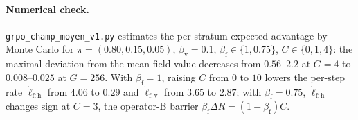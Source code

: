 \paragraph{Numerical check.} \texttt{grpo\_champ\_moyen\_v1.py} estimates the per-stratum expected advantage by Monte Carlo for $\pi = (0.80, 0.15, 0.05)$, $\beta_{\mathrm{v}} = 0.1$, $\beta_{\mathrm{f}} \in \{1, 0.75\}$, $C \in \{0, 1, 4\}$: the maximal deviation from the mean-field value decreases from $0.56$--$2.2$ at $G = 4$ to $0.008$--$0.025$ at $G = 256$. With $\beta_{\mathrm{f}} = 1$, raising $C$ from $0$ to $10$ lowers the per-step rate $\dot\ell_{\mathrm{f:h}}$ from $4.06$ to $0.29$ and $\dot\ell_{\mathrm{f:v}}$ from $3.65$ to $2.87$; with $\beta_{\mathrm{f}} = 0.75$, $\dot\ell_{\mathrm{f:h}}$ changes sign at $C = 3$, the operator-B barrier $\beta_{\mathrm{f}}\Delta R = (1 - \beta_{\mathrm{f}})C$.
